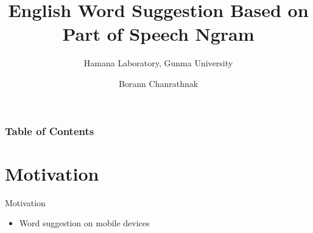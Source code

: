 \documentclass{beamer}
\title{English Word Suggestion Based on Part of Speech Ngram}
\subtitle{Hamana Laboratory, Gunma University}
\author{Borann Chanrathnak}
\begin{document}
\maketitle


\begin{frame}
\frametitle{Table of Contents}
\tableofcontents
\end{frame}

\section{Motivation}
\begin{frame}{Motivation}
    \begin{itemize}
        \item Word suggestion on mobile devices
    \end{itemize}
    \centering
\end{frame}
\end{document}
